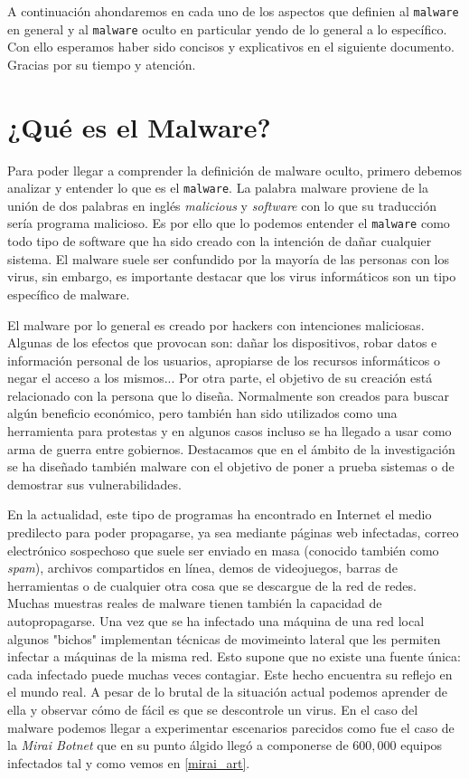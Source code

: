 \documentclass[12pt]{article}
\newcommand{\newpar} {
    \vskip 0.5cm
}
\begin{document}
        \newpar

        A continuación ahondaremos en cada uno de los aspectos que definien al \texttt{malware} en general y al \texttt{malware} oculto en particular yendo de lo general a lo específico. Con ello esperamos haber sido concisos y explicativos en el siguiente documento. Gracias por su tiempo y atención.

    \section{¿Qué es el Malware?}
        Para poder llegar a comprender la definición de malware oculto, primero debemos analizar y entender lo que es el \texttt{malware}. La palabra malware proviene de la unión de dos palabras en inglés \textit{malicious} y \textit{software} con lo que su traducción sería programa malicioso. Es por ello que lo podemos entender el \texttt{malware} como todo tipo de software que ha sido creado con la intención de dañar cualquier sistema. El malware suele ser confundido por la mayoría de las personas con los virus, sin embargo, es importante destacar que los virus informáticos son un tipo específico de malware.

        \newpar

        El malware por lo general es creado por hackers con intenciones maliciosas. Algunas de los efectos que provocan son: dañar los dispositivos, robar datos e información personal de los usuarios, apropiarse de los recursos informáticos o negar el acceso a los mismos... Por otra parte, el objetivo de su creación está relacionado con la persona que lo diseña. Normalmente son creados para buscar algún beneficio económico, pero también han sido utilizados como una herramienta para protestas y en algunos casos incluso se ha llegado a usar como arma de guerra entre gobiernos. Destacamos que en el ámbito de la investigación se ha diseñado también malware con el objetivo de poner a prueba sistemas o de demostrar sus vulnerabilidades.

        \newpar

        En la actualidad, este tipo de programas ha encontrado en Internet el medio predilecto para poder propagarse, ya sea mediante páginas web infectadas, correo electrónico sospechoso que suele ser enviado en masa (conocido también como \textit{spam}), archivos compartidos en línea, demos de videojuegos, barras de herramientas o de cualquier otra cosa que se descargue de la red de redes. Muchas muestras reales de malware tienen también la capacidad de autopropagarse. Una vez que se ha infectado una máquina de una red local algunos "bichos" implementan técnicas de movimeinto lateral que les permiten infectar a máquinas de la misma red. Esto supone que no existe una fuente única: cada infectado puede muchas veces contagiar. Este hecho encuentra su reflejo en el mundo real. A pesar de lo brutal de la situación actual podemos aprender de ella y observar cómo de fácil es que se descontrole un virus. En el caso del malware podemos llegar a experimentar escenarios parecidos como fue el caso de la \textit{Mirai Botnet} que en su punto álgido llegó a componerse de $600,000$ equipos infectados tal y como vemos en \ref{mirai_art}.
\end{document}

